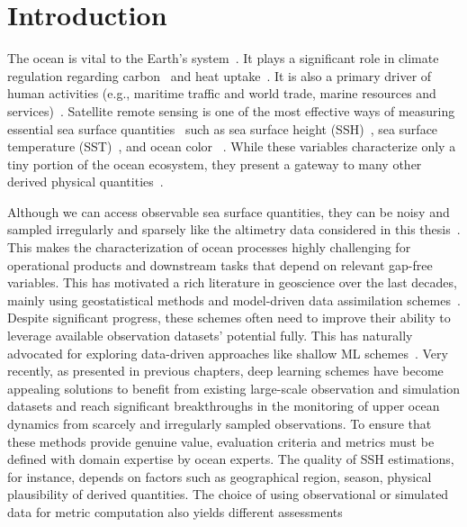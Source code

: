 \section{Introduction}

The ocean is vital to the Earth's system~\cite{OCEANWARMING}. 
It plays a significant role in climate regulation regarding carbon~\cite{OCEANCARBONCYCLE} and heat uptake~\cite{OCEANHEATUPTAKE}. It is also a primary driver of human activities (e.g., maritime traffic and world trade, marine resources and services)~\cite{SSHOPERATIONAL, ML4OCN}. 
Satellite remote sensing is one of the most effective ways of measuring essential sea surface quantities~\cite{Altimetry} such as sea surface height (SSH)~\cite{DUACS}, sea surface temperature (SST)~\cite{OCEANSATELLITESST}, and ocean color ~\cite{OCEANSATELLITEOC}. 
While these variables characterize only a tiny portion of the ocean ecosystem, they present a gateway to many other derived physical quantities~\cite{ML4OCN}.

Although we can access observable sea surface quantities, they can be noisy and sampled irregularly and sparsely like the altimetry data considered in this thesis~\cite{DUACS}. 
This makes the characterization of ocean processes highly challenging for operational products and downstream tasks that depend on relevant gap-free variables. This has motivated a rich literature in geoscience over the last decades, mainly using geostatistical methods \cite{DUACS, MIOST} and model-driven data assimilation schemes~\cite{BFNQG, GLORYS12}. Despite significant progress, these schemes often need to improve their ability to leverage available observation datasets' potential fully. 
This has naturally advocated for exploring data-driven approaches like shallow ML schemes~\cite{DINEOF, DINEOF2, ANALOGDA2, ANALOGDA}. Very recently, as presented in previous chapters, deep learning schemes \cite{SSHInterpAttention, SSHInterpConvLSTM, SSHInterpUNet} have become appealing solutions to benefit from existing large-scale observation and simulation datasets and reach significant breakthroughs in the monitoring of upper ocean dynamics from scarcely and irregularly sampled observations. 
To ensure that these methods provide genuine value, evaluation criteria and metrics must be defined with domain expertise by ocean experts. The quality of SSH estimations, for instance, depends on factors such as geographical region, season, physical plausibility of derived quantities. The choice of using observational or simulated data for metric computation also yields different assessments


